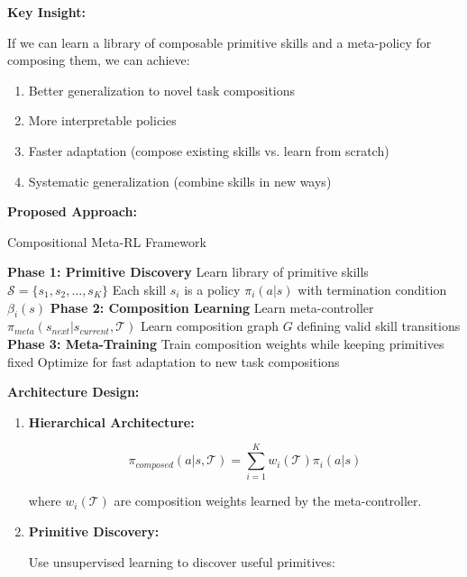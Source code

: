 \documentclass[12pt]{article}
\newcommand{\ieee}[1]{\textcolor{IEEEBlue}{\textbf{#1}}}
\begin{document}
{{			\ieee{Key Insight:}
			
			If we can learn a library of composable primitive skills and a meta-policy for composing them, we can achieve:
			
			\begin{enumerate}
				\item Better generalization to novel task compositions
				\item More interpretable policies
				\item Faster adaptation (compose existing skills vs. learn from scratch)
				\item Systematic generalization (combine skills in new ways)
			\end{enumerate}
			
			\ieee{Proposed Approach:}
			
			\begin{algorithm}[H]
			\caption{Compositional Meta-RL Framework}
			\begin{algorithmic}[1]
			\STATE \textbf{Phase 1: Primitive Discovery}
			\STATE Learn library of primitive skills $\mathcal{S} = \{s_1, s_2, \ldots, s_K\}$
			\STATE Each skill $s_i$ is a policy $\pi_i(a|s)$ with termination condition $\beta_i(s)$
			\STATE \textbf{Phase 2: Composition Learning}
			\STATE Learn meta-controller $\pi_{meta}(s_{next}|s_{current}, \mathcal{T})$
			\STATE Learn composition graph $G$ defining valid skill transitions
			\STATE \textbf{Phase 3: Meta-Training}
			\STATE Train composition weights while keeping primitives fixed
			\STATE Optimize for fast adaptation to new task compositions
			\end{algorithmic}
			\end{algorithm}
			
			\ieee{Architecture Design:}
			
			\begin{enumerate}
				\item \textbf{Hierarchical Architecture:}
				
				\begin{equation}
				\pi_{composed}(a|s, \mathcal{T}) = \sum_{i=1}^K w_i(\mathcal{T}) \pi_i(a|s)
				\end{equation}
				
				where $w_i(\mathcal{T})$ are composition weights learned by the meta-controller.
				
				\item \textbf{Primitive Discovery:}
				
				Use unsupervised learning to discover useful primitives:
				

\end{enumerate}}}
\end{document}
